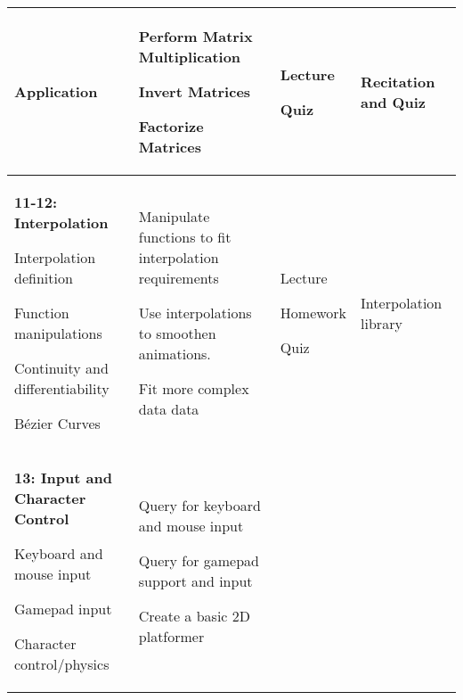 \documentclass[10pt]{article}
\newenvironment{itemize*}{
\begin{itemize}[leftmargin=1em,noitemsep,nolistsep]
}{\end{itemize}}
\begin{document}
\begin{longtable}{||p{1.8in}|p{2.4in}|p{1.3in}|p{1in}||}
\begin{itemize*}
		 \item Application
	\end{itemize*} &
	\begin{itemize*}
		\item Perform Matrix Multiplication
		\item Invert Matrices
		\item Factorize Matrices
	\end{itemize*} &
	\begin{itemize*}
		\item Lecture
		\item Quiz
	\end{itemize*} & Recitation and Quiz\\ \hline
\textbf{11-12: Interpolation}
	\begin{itemize*}
		\item Interpolation definition
		\item Function manipulations
		\item Continuity and differentiability
		\item B\'ezier Curves
	\end{itemize*} &
	\begin{itemize*}
		\item Manipulate functions to fit interpolation requirements
		\item Use interpolations to smoothen animations.
		\item Fit more complex data data
	\end{itemize*} & 
	\begin{itemize*}
		\item Lecture
		\item Homework
	\end{itemize*} Quiz &
	Interpolation library
		\\ \hline
\textbf{13: Input and Character Control} 
	\begin{itemize*}
		\item Keyboard and mouse input
		\item Gamepad input
		\item Character control/physics
	\end{itemize*} &
	\begin{itemize*}
		\item Query for keyboard and mouse input
		\item Query for gamepad support and input
		\item Create a basic 2D platformer
	\end{itemize*} & 
	\begin{itemize*}

\end{itemize*}
\end{longtable}
\end{document}
